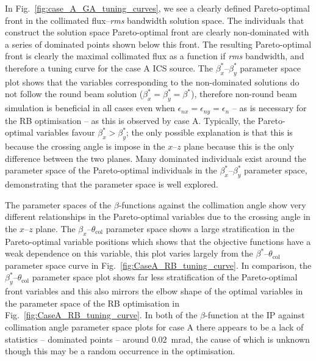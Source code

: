 \documentclass[../main.tex]{subfiles}
\begin{document}
In Fig.~\ref{fig:case_A_GA_tuning_curves}, we see a clearly defined Pareto-optimal front in the collimated flux--\textit{rms} bandwidth solution space. The individuals that construct the solution space Pareto-optimal front are clearly non-dominated with a series of dominated points shown below this front. The resulting Pareto-optimal front is clearly the maximal collimated flux as a function if \textit{rms} bandwidth, and therefore a tuning curve for the case A ICS source. The $\beta_{x}^{*}$--$\beta_{y}^{*}$ parameter space plot shows that the variables corresponding to the non-dominated solutions do not follow the round beam solution ($\beta_{x}^{*}=\beta_{y}^{*}=\beta^{*}$), therefore non-round beam simulation is beneficial in all cases even when $\epsilon_{nx}=\epsilon_{ny}=\epsilon_{n}$ -- as is necessary for the RB optimisation -- as this is observed by case A. Typically, the Pareto-optimal variables favour $\beta_{x}^{*}>\beta_{y}^{*}$; the only possible explanation is that this is because the crossing angle is impose in the $x$--$z$ plane because this is the only difference between the two planes. Many dominated individuals exist around the parameter space of the Pareto-optimal individuals in the $\beta_{x}^{*}$--$\beta_{y}^{*}$ parameter space, demonstrating that the parameter space is well explored.

The parameter spaces  of the $\beta$-functions against the collimation angle show very different relationships in the Pareto-optimal variables due to the crossing angle in the $x$--$z$ plane. The $\beta_{x}$--$\theta_{\mathrm{col}}$ parameter space shows a large stratification in the Pareto-optimal variable positions which shows that the objective functions have a weak dependence on this variable, this plot varies largely from the $\beta^{*}$--$\theta_{\mathrm{col}}$ parameter space curve in Fig.~\ref{fig:CaseA_RB_tuning_curve}. In comparison, the $\beta_{y}^{*}$--$\theta_{\mathrm{col}}$ parameter space plot shows far less stratification of the Pareto-optimal front variables and this also mirrors the elbow shape of the optimal variables in the parameter space of the RB optimisation in Fig.~\ref{fig:CaseA_RB_tuning_curve}. In both of the $\beta$-function at the IP against collimation angle parameter space plots for case A there appears to be a lack of statistics -- dominated points -- around 0.02~\si{\milli\radian}, the cause of which is unknown though this may be a random occurrence in the optimisation.    
\end{document}

